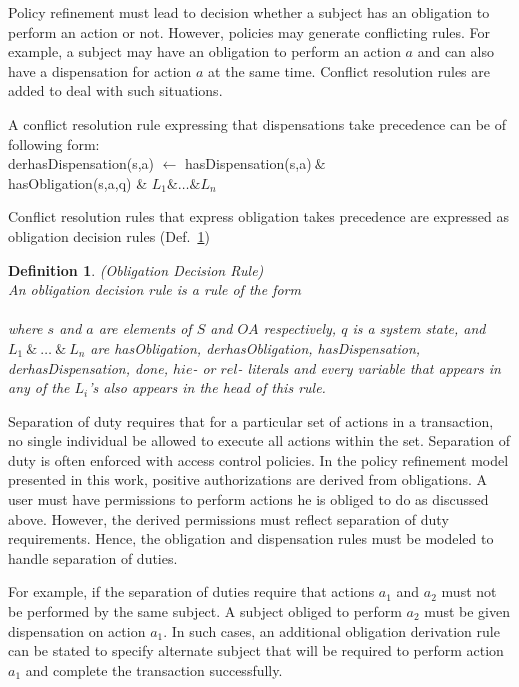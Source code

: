 \documentclass[12pt,journal,letterpaper,onecolumn]{IEEEtran}
\newtheorem{definition}{Definition}[section]
\begin{document}
Policy refinement must lead to decision whether a subject has an
obligation to perform an action or not. However, policies may
generate conflicting rules. For example, a subject may have an
obligation to perform an action $a$ and can also have a dispensation
for action $a$ at the same time. Conflict resolution rules are added
to deal with such situations.

A conflict resolution rule expressing that dispensations take
precedence can be of following form: \\
{\ttfamily derhasDispensation(s,a) $\leftarrow$
  hasDispensation(s,a)$~\&~$ \\
  \indent\indent\indent\indent\indent\indent\indent\indent\indent
  \indent\indent\indent\indent\indent\indent\indent\indent\indent
   hasObligation(s,a,q)  \& $L_1 \& \ldots \& L_n$}

Conflict resolution rules that express obligation takes precedence
are expressed as obligation decision rules
(Def.~\ref{def:obligationdecisionrule})

\begin{definition}(Obligation Decision Rule)\\
An obligation decision rule is a rule of the form \\
 \\
where $s$ and $a$ are elements of $S$ and $OA$ respectively, $q$ is
a system state, and $L_1~\&~\ldots~\&~L_n$ are {\ttfamily
hasObligation, derhasObligation, hasDispensation, derhasDispensation,
done}, $hie$- or $rel$- literals and every variable
that appears in any of the $L_i$'s also appears in the head of this
rule. \label{def:obligationdecisionrule}
\end{definition}

Separation of duty requires that for a particular set of actions in
a transaction, no single individual be allowed to execute all
actions within the set. Separation of duty is often enforced with
access control policies.  In the policy refinement model presented
in this work, positive authorizations are derived from obligations.
A user must have permissions to perform actions he is obliged to do
as discussed above. However, the derived permissions must reflect
separation of duty requirements. Hence, the obligation and
dispensation rules must be modeled to handle separation of duties.

For example, if the separation of duties require that actions $a_1$
and $a_2$ must not be performed by the same subject. A subject
obliged to perform $a_2$ must be given dispensation on action $a_1$.
In such cases, an additional obligation derivation rule can be
stated to specify alternate subject that will be required to
perform action $a_1$ and complete the transaction successfully.
\end{document}
